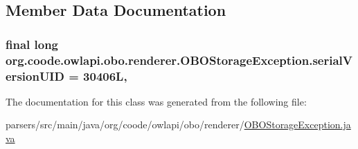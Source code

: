 \subsection{Member Data Documentation}
\hypertarget{classorg_1_1coode_1_1owlapi_1_1obo_1_1renderer_1_1_o_b_o_storage_exception_a93e53e1d7ae1edb42e60b358ed6288b7}{
\subsubsection[{serial\-Version\-U\-I\-D}]{\setlength{\rightskip}{0pt plus 5cm}final long org.\-coode.\-owlapi.\-obo.\-renderer.\-O\-B\-O\-Storage\-Exception.\-serial\-Version\-U\-I\-D = 30406\-L\hspace{0.3cm}{\ttfamily [static]}, {\ttfamily [private]}}}\label{classorg_1_1coode_1_1owlapi_1_1obo_1_1renderer_1_1_o_b_o_storage_exception_a93e53e1d7ae1edb42e60b358ed6288b7}


The documentation for this class was generated from the following file\-:\begin{DoxyCompactItemize}
\item 
parsers/src/main/java/org/coode/owlapi/obo/renderer/\hyperlink{_o_b_o_storage_exception_8java}{O\-B\-O\-Storage\-Exception.\-java}\end{DoxyCompactItemize}
